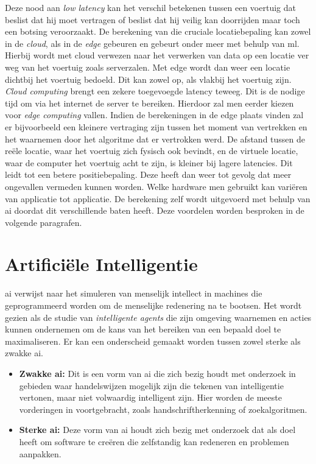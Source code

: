 Deze nood aan \textit{low latency} kan het verschil betekenen tussen een voertuig dat beslist dat hij moet vertragen of beslist dat hij veilig kan doorrijden maar toch een botsing veroorzaakt. De berekening van die cruciale locatiebepaling kan zowel in de \textit{cloud}, als in de \textit{edge}\cite{edgecomputingLi} gebeuren en gebeurt onder meer met behulp van \gls{ml}. Hierbij wordt met cloud verwezen naar het verwerken van data op een locatie ver weg van het voertuig zoals serverzalen. Met edge wordt dan weer een locatie dichtbij het voertuig bedoeld. Dit kan zowel op, als vlakbij het voertuig zijn. \textit{Cloud computing} brengt een zekere toegevoegde latency teweeg. Dit is de nodige tijd om via het internet de server te bereiken. Hierdoor zal men eerder kiezen voor \textit{edge computing} vallen. Indien de berekeningen in de edge plaats vinden zal er bijvoorbeeld een kleinere vertraging zijn tussen het moment van vertrekken en het waarnemen door het algoritme dat er vertrokken werd. De afstand tussen de re\"ele locatie, waar het voertuig zich fysisch ook bevindt, en de virtuele locatie, waar de computer het voertuig acht te zijn, is kleiner bij lagere latencies. Dit leidt tot een betere positiebepaling. Deze heeft dan weer tot gevolg dat meer ongevallen vermeden kunnen worden. Welke hardware men gebruikt kan vari\"eren van applicatie tot applicatie. De berekening zelf wordt uitgevoerd met behulp van \gls{ai} doordat dit verschillende baten heeft. Deze voordelen worden besproken in de volgende paragrafen.



\newpage

\section{Artifici\"ele Intelligentie}
\gls{ai} verwijst naar het simuleren van menselijk intellect in machines die geprogrammeerd worden om de menselijke redenering na te bootsen. Het wordt gezien als de studie van \textit{intelligente agents} die zijn omgeving waarnemen en acties kunnen ondernemen om de kans van het bereiken van een bepaald doel te maximaliseren\cite{poole1998computational}. Er kan een onderscheid gemaakt worden tussen zowel sterke als zwakke \gls{ai}.
\begin{itemize}
	\item \textbf{Zwakke \gls{ai}:} Dit is een vorm van \gls{ai} die zich bezig houdt met onderzoek in gebieden waar handelswijzen mogelijk zijn die tekenen van intelligentie vertonen, maar niet volwaardig intelligent zijn. Hier worden de meeste vorderingen in voortgebracht, zoals handschriftherkenning of zoekalgoritmen.
	\item \textbf{Sterke \gls{ai}:} Deze vorm van \gls{ai} houdt zich bezig met onderzoek dat als doel heeft om software te cre\"eren die zelfstandig kan redeneren en problemen aanpakken.
\end{itemize}

